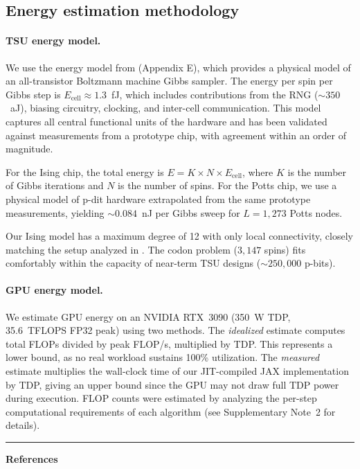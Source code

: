 \documentclass[11pt,twocolumn]{article}
\begin{document}
\subsection{Energy estimation methodology}\label{sec:methods_energy}

\paragraph{TSU energy model.}
We use the energy model from \cite{jelincic2025dtm} (Appendix E), which provides a physical model of an all-transistor Boltzmann machine Gibbs sampler.
The energy per spin per Gibbs step is $E_\text{cell} \approx 1.3$~fJ, which includes contributions from the RNG (${\sim}350$~aJ), biasing circuitry, clocking, and inter-cell communication.
This model captures all central functional units of the hardware and has been validated against measurements from a prototype chip, with agreement within an order of magnitude.

For the Ising chip, the total energy is $E = K \times N \times E_\text{cell}$, where $K$ is the number of Gibbs iterations and $N$ is the number of spins.
For the Potts chip, we use a physical model of p-dit hardware extrapolated from the same prototype measurements, yielding ${\sim}0.084$~nJ per Gibbs sweep for $L = 1{,}273$ Potts nodes.

Our Ising model has a maximum degree of 12 with only local connectivity, closely matching the setup analyzed in \cite{jelincic2025dtm}.
The codon problem ($3{,}147$ spins) fits comfortably within the capacity of near-term TSU designs (${\sim}250{,}000$ p-bits).

\paragraph{GPU energy model.}
We estimate GPU energy on an NVIDIA RTX~3090 (350~W TDP, 35.6~TFLOPS FP32 peak) using two methods.
The \emph{idealized} estimate computes total FLOPs divided by peak FLOP/s, multiplied by TDP.
This represents a lower bound, as no real workload sustains 100\% utilization.
The \emph{measured} estimate multiplies the wall-clock time of our JIT-compiled JAX implementation by TDP, giving an upper bound since the GPU may not draw full TDP power during execution.
FLOP counts were estimated by analyzing the per-step computational requirements of each algorithm (see Supplementary Note~2 for details).

\begin{strip}
\vspace{0.8em}
\noindent\rule{\textwidth}{1pt}
\begin{center}\large\bfseries References\end{center}
\vspace{-0.3em}
\end{strip}
\renewcommand{\section}[2]{}%
{\small }
\end{document}
